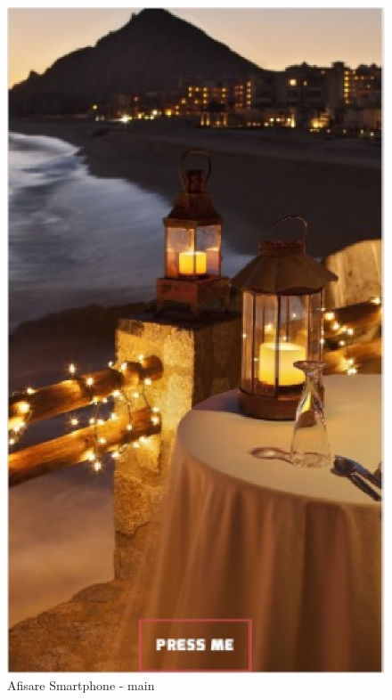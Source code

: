 \documentclass[11pt]{article}
\begin{document}
\begin{figure}[h]
\includegraphics{images/6.eps}
\caption{Afisare Smartphone - main}
\end{figure}
\end{document}
